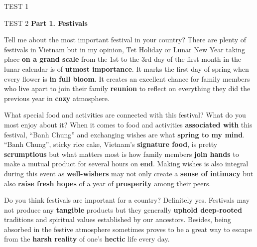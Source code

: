 \begin{glossarymc}[Cambridge 3]
\begin{test}{TEST 1}
\begin{VocabHighlights}
\end{VocabHighlights}
\end{test}

\newpage
\begin{test}{TEST 2}
\textbf{Part 1. Festivals}

\begin{qa}{Tell me about the most important festival in your country?}
There are plenty of festivals in Vietnam but in my opinion, Tet Holiday or Lunar New Year taking place \textbf{on a grand scale} from the 1st to the 3rd day of the first month in the lunar calendar is of \textbf{utmost importance}. It marks the first day of spring when every flower is \textbf{in full bloom}. It creates an excellent chance for family members who live apart to join their family \textbf{reunion} to reflect on everything they did the previous year in \textbf{cozy} atmosphere.
\end{qa}

\begin{qa}{What special food and activities are connected with this festival? What do you most enjoy about it?}
When it comes to food and activities \textbf{associated with} this festival, ``Banh Chung'' and exchanging wishes are what \textbf{spring to my mind}. ``Banh Chung'', sticky rice cake, Vietnam's \textbf{signature food}, is pretty \textbf{scrumptious} but what matters most is how family members \textbf{join hands} to make a mutual product for several hours on \textbf{end}. Making wishes is also integral during this event as \textbf{well-wishers} may not only create a \textbf{sense of intimacy} but also \textbf{raise fresh hopes} of a year of \textbf{prosperity} among their peers.
\end{qa}

\begin{qa}{Do you think festivals are important for a country?}
Definitely yes. Festivals may not produce any \textbf{tangible} products but they generally \textbf{uphold deep-rooted} traditions and spiritual values established by our ancestors. Besides, being absorbed in the festive atmosphere sometimes proves to be a great way to escape from the \textbf{harsh reality} of one's \textbf{hectic} life every day.
\end{qa}


\end{test}
\end{glossarymc}
